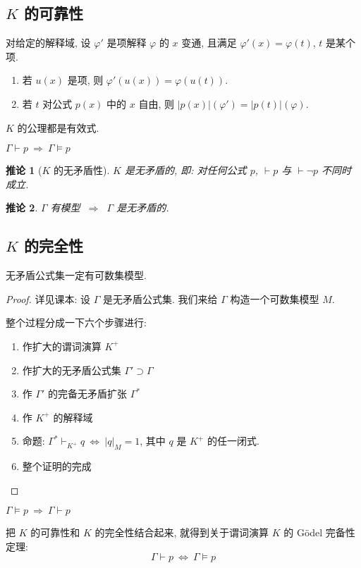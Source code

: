 \documentclass[
    color=black,
    device=normal,
    lang=cn
]{elegantnote}
\newtheorem{deduction}{推论}[subsection]
\begin{document}
\subsection{\texorpdfstring{$K$}{K} 的可靠性}
\begin{lemma}
    对给定的解释域, 设 $\varphi'$ 是项解释 $\varphi$ 的 $x$ 变通, 且满足 $\varphi'(x)=\varphi(t)$, $t$ 是某个项.
    \begin{enumerate}[label = $\arabic*^\circ$]
        \item 若 $u(x)$ 是项, 则 $\varphi'(u(x)) = \varphi(u(t))$.
        \item 若 $t$ 对公式 $p(x)$ 中的 $x$ 自由, 则 $\lvert p(x)\rvert(\varphi')=\lvert p(t)\rvert(\varphi)$.
    \end{enumerate}
\end{lemma}
\begin{lemma}
    $K$ 的公理都是有效式.
\end{lemma}
\begin{theorem}[$K$ 的可靠性]
    $\Gamma\vdash p\ \Rightarrow\ \Gamma\vDash p$
\end{theorem}
\begin{deduction}[$K$ 的无矛盾性]
    $K$ 是无矛盾的, 即: 对任何公式 $p$, $\vdash p$ 与 $\vdash\lnot p$ 不同时成立.
\end{deduction}
\begin{deduction}
    $\Gamma$ 有模型 $\ \Rightarrow\ $ $\Gamma$ 是无矛盾的.
\end{deduction}

\subsection{\texorpdfstring{$K$}{K} 的完全性}
\begin{definition}
    无矛盾公式集一定有可数集模型.
\end{definition}
\begin{proof}
    详见课本: 设 $\Gamma$ 是无矛盾公式集. 我们来给 $\Gamma$ 构造一个可数集模型 $M$.

    整个过程分成一下六个步骤进行:
    \begin{enumerate}[1.]
        \item 作扩大的谓词演算 $K^+$
        \item 作扩大的无矛盾公式集 $\Gamma'\supset \Gamma$
        \item 作 $\Gamma'$ 的完备无矛盾扩张 $\Gamma^*$
        \item 作 $K^+$ 的解释域
        \item 命题: $\Gamma^*\vdash_{K^+}q\ \Leftrightarrow\ \lvert q\rvert_M = 1$, 其中 $q$ 是 $K^+$ 的任一闭式.
        \item 整个证明的完成
    \end{enumerate}
\end{proof}
\begin{theorem}[$K$ 的完全性]
    $\Gamma\vDash p\ \Rightarrow\ \Gamma\vdash p$
\end{theorem}
把 $K$ 的可靠性和 $K$ 的完全性结合起来, 就得到关于谓词演算 $K$ 的 Gödel 完备性定理:
$$
    \Gamma\vdash p\ \Leftrightarrow\ \Gamma\vDash p
$$
\end{document}
